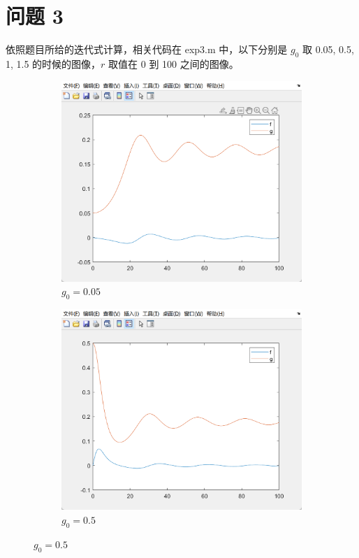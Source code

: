 \documentclass[11pt]{ctexart}
\begin{document}
    \section{问题 3}
    依照题目所给的迭代式计算，相关代码在 exp3.m 中，以下分别是 \(g_0\) 取 0.05, 0.5, 1, 1.5 的时候的图像，\(r\) 取值在 0 到 100 之间的图像。
    \begin{figure}[H]
        \centering
        \begin{subfigure}[h]{0.4\textwidth}
            \includegraphics[width=\textwidth]{picture/exp3_1_1}
            \caption{\(g_0=0.05\)}
        \end{subfigure}
        \begin{subfigure}[h]{0.4\textwidth}
            \includegraphics[width=\textwidth]{picture/exp3_1_2}
            \caption{\(g_0=0.5\)}
        \end{subfigure}


\end{figure}
\end{document}

